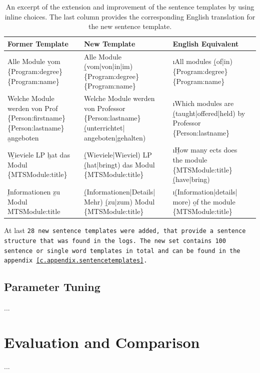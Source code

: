 \begin{table}[H]
	\vspace{1ex}\small\centering{}\begin{tabular}{|>{\raggedright}p{43mm}|>{\raggedright}p{43mm}|>{\raggedright}p{43mm}|c|}
	\hline
	Former Template & New Template & English Equivalent & \\
	\hline\hline
	Alle Module \b{vom} \{Program:degree\} \{Program:name\} & Alle Module \b{(vom|von|in|im)} \{Program:degree\} \{Program:name\} & \i{All modules \b{(of|in)} \{Program:degree\} \{Program:name\} } & \\ \hline
	Welche Module werden von Prof \{Person:firstname\} \{Person:lastname\} \b{angeboten} & Welche Module werden von Professor \{Person:lastname\} \b{(unterrichtet| angeboten|gehalten)} & \i{Which modules are \b{(taught|offered|held)} by Professor \{Person:lastname\} } & \\ \hline
	\b{Wieviele} LP \b{hat} das Modul \{MTSModule:title\} & \b{(Wieviele|Wieviel)} LP \b{(hat|bringt)} das Modul \{MTSModule:title\} & \i{\b{How many} ects does the module \{MTSModule:title\} \b{(have|bring)} } & \\ \hline
	\b{Informationen} \b{zu} Modul {MTSModule:title} & \b{(Informationen|Details| Mehr)} \b{(zu|zum)} Modul \{MTSModule:title\} & \i{\b{(Information|details| more)} \b{of} the module \{MTSModule:title\} } & \\ \hline
	\end{tabular}
	\caption[Sentence Template Improvements]{An excerpt of the extension and improvement of the sentence templates by using inline choices. The last column provides the corresponding English translation for the new sentence template.}
	\label{t.improved_sentence_templates}
	\vspace{1ex}
\end{table}

At last \tt{28} new sentence templates were added, that provide a sentence structure that was found in the logs. The new set contains \tt{100} sentence or single word templates in total and can be found in the appendix \ref{c.appendix.sentencetemplates}.

\section{Parameter Tuning}\label{c.training.tuning}
...

\chapter{Evaluation and Comparison}\label{c.evaluation}
...

